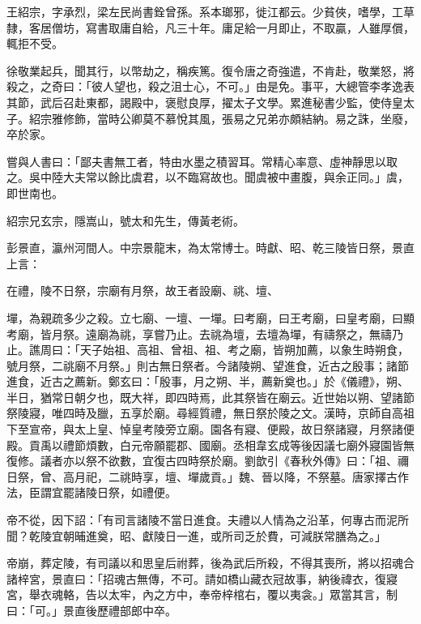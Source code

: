 \begin{pinyinscope}
 王紹宗，字承烈，梁左民尚書銓曾孫。系本瑯邪，徙江都云。少貧俠，嗜學，工草隸，客居僧坊，寫書取庸自給，凡三十年。庸足給一月即止，不取贏，人雖厚償，輒拒不受。



 徐敬業起兵，聞其行，以幣劫之，稱疾篤。復令唐之奇強遣，不肯赴，敬業怒，將殺之，之奇曰：「彼人望也，殺之沮士心，不可。」由是免。事平，大總管李孝逸表其節，武后召赴東都，謁殿中，褒慰良厚，擢太子文學。累進秘書少監，使侍皇太子。紹宗雅修飾，當時公卿莫不慕悅其風，張易之兄弟亦頗結納。易之誅，坐廢，卒於家。



 嘗與人書曰：「鄙夫書無工者，特由水墨之積習耳。常精心率意、虛神靜思以取之。吳中陸大夫常以餘比虞君，以不臨寫故也。聞虞被中畫腹，與余正同。」虞，即世南也。



 紹宗兄玄宗，隱嵩山，號太和先生，傳黃老術。



 彭景直，瀛州河間人。中宗景龍末，為太常博士。時獻、昭、乾三陵皆日祭，景直上言：



 在禮，陵不日祭，宗廟有月祭，故王者設廟、祧、壇、



 墠，為親疏多少之殺。立七廟、一壇、一墠。曰考廟，曰王考廟，曰皇考廟，曰顯考廟，皆月祭。遠廟為祧，享嘗乃止。去祧為壇，去壇為墠，有禱祭之，無禱乃止。譙周曰：「天子始祖、高祖、曾祖、祖、考之廟，皆朔加薦，以象生時朔食，號月祭，二祧廟不月祭。」則古無日祭者。今諸陵朔、望進食，近古之殷事；諸節進食，近古之薦新。鄭玄曰：「殷事，月之朔、半，薦新奠也。」於《儀禮》，朔、半日，猶常日朝夕也，既大祥，即四時焉，此其祭皆在廟云。近世始以朔、望諸節祭陵寢，唯四時及臘，五享於廟。尋經質禮，無日祭於陵之文。漢時，京師自高祖下至宣帝，與太上皇、悼皇考陵旁立廟。園各有寢、便殿，故日祭諸寢，月祭諸便殿。貢禹以禮節煩數，白元帝願罷郡、國廟。丞相韋玄成等後因議七廟外寢園皆無復修。議者亦以祭不欲數，宜復古四時祭於廟。劉歆引《春秋外傳》曰：「祖、禰日祭，曾、高月祀，二祧時享，壇、墠歲貢。」魏、晉以降，不祭墓。唐家擇古作法，臣謂宜罷諸陵日祭，如禮便。



 帝不從，因下詔：「有司言諸陵不當日進食。夫禮以人情為之沿革，何專古而泥所聞？乾陵宜朝晡進奠，昭、獻陵日一進，或所司乏於費，可減朕常膳為之。」



 帝崩，葬定陵，有司議以和思皇后祔葬，後為武后所殺，不得其喪所，將以招魂合諸梓宮，景直曰：「招魂古無傳，不可。請如橋山藏衣冠故事，納後禕衣，復寢宮，舉衣魂輅，告以太牢，內之方中，奉帝梓棺右，覆以夷衾。」眾當其言，制曰：「可。」景直後歷禮部郎中卒。




\end{pinyinscope}
